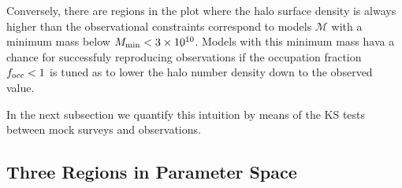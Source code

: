 \documentclass[usenatbib]{mn2e}
\newcommand{\hMsun}{{\ifmmode{h^{-1}{\rm
        {M_{\odot}}}}\else{$h^{-1}{\rm{M_{\odot}}}$}\fi}}
\begin{document}
Conversely, there are regions in the plot where the halo surface
density is always higher than the observational constraints correspond
to models ${\mathcal M}$ with a minimum mass below $M_{\rm min}<
3\times 10^{10}$\hMsun. Models with this minimum mass hava a chance
for successfuly reproducing observations if the occupation fraction
$f_{\rm occ}<1$ is tuned as to lower the halo number density down to
the observed value.    

In the next subsection we quantify this intuition by means of the KS
tests between mock surveys and observations.

\subsection{Three Regions in Parameter Space}
\end{document}
